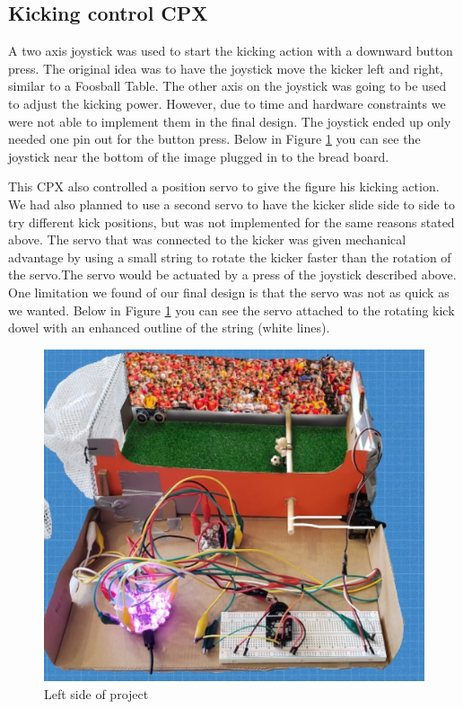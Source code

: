 \documentclass[12pt]{article}
\begin{document}
\subsection{Kicking control CPX}

A two axis joystick was used to start the kicking action with a downward button press. The original idea was to have the joystick move the kicker left and right, similar to a Foosball Table. The other axis on the joystick was going to be used to adjust the kicking power. However, due to time and hardware constraints we were not able to implement them in the final design. The joystick ended up only needed one pin out for the button press. Below in Figure \ref{fig:left} you can see the joystick near the bottom of the image plugged in to the bread board. 

This CPX also controlled a position servo to give the figure his kicking action. We had also planned to use a second servo to have the kicker slide side to side to try different kick positions, but was not implemented for the same reasons stated above. The servo that was connected to the kicker was given mechanical advantage by using a small string to rotate the kicker faster than the rotation of the servo.The servo would be actuated by a press of the joystick described above. One limitation we found of our final design is that the servo was not as quick as we wanted. Below in Figure \ref{fig:left} you can see the servo attached to the rotating kick dowel with an enhanced outline of the string (white lines).

\begin{figure}[!t]
\centering
\includegraphics[width=4.5in]{project_left.jpg}
\caption{Left side of project}
\label{fig:left}
\end{figure}
\end{document}
